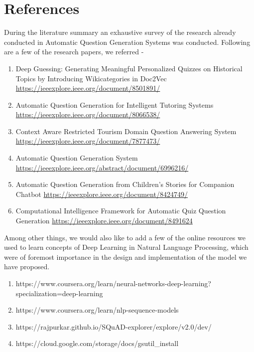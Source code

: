 \chapter{References}

During the literature summary an exhaustive survey of the research already
conducted in Automatic Question Generation Systems was conducted. Following are
a few of the research papers, we referred - 

\begin{enumerate}

\item Deep Guessing: Generating Meaningful Personalized Quizzes on Historical
Topics by Introducing Wikicategories in Doc2Vec \url{https://ieeexplore.ieee.org/document/8501891/}

\item Automatic Question Generation for Intelligent Tutoring Systems \url{https://ieeexplore.ieee.org/document/8066538/}

\item Context Aware Restricted Tourism Domain Question Answering System \url{https://ieeexplore.ieee.org/document/7877473/}

\item Automatic Question Generation System \url{https://ieeexplore.ieee.org/abstract/document/6996216/}

\item Automatic Question Generation from Children’s Stories for Companion
Chatbot \url{https://ieeexplore.ieee.org/document/8424749/}

\item Computational Intelligence Framework for Automatic Quiz Question
Generation \url{https://ieeexplore.ieee.org/document/8491624}

\end{enumerate}

Among other things, we would also like to add a few of the online resources we
used to learn concepts of Deep Learning in Natural Language Processing, which
were of foremost importance in the design and implementation of the model we
have proposed. 

\begin{enumerate}

\item
https://www.coursera.org/learn/neural-networks-deep-learning?specialization=deep-learning

\item https://www.coursera.org/learn/nlp-sequence-models

\item https://rajpurkar.github.io/SQuAD-explorer/explore/v2.0/dev/

\item https://cloud.google.com/storage/docs/gsutil\_install

\end{enumerate}

